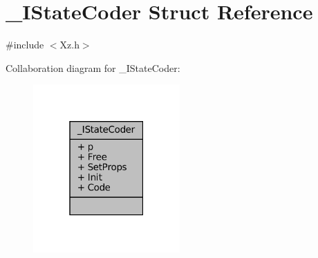 \hypertarget{struct___i_state_coder}{}\section{\+\_\+\+I\+State\+Coder Struct Reference}
\label{struct___i_state_coder}


{\ttfamily \#include $<$Xz.\+h$>$}



Collaboration diagram for \+\_\+\+I\+State\+Coder\+:
\nopagebreak
\begin{figure}[H]
\begin{center}
\leavevmode
\includegraphics[width=159pt]{struct___i_state_coder__coll__graph}
\end{center}
\end{figure}
